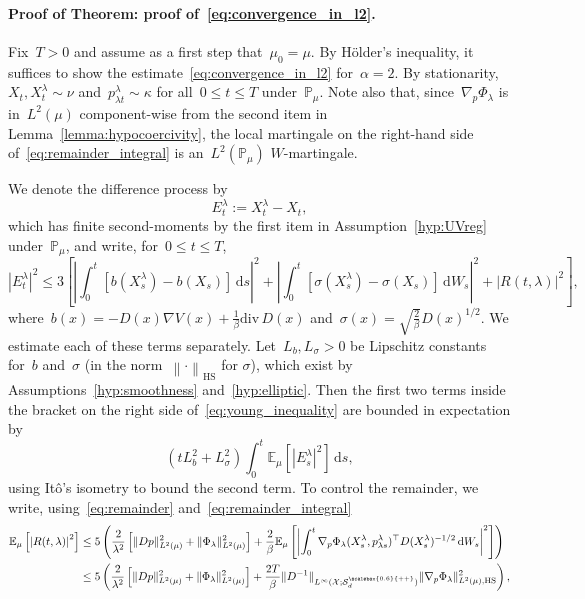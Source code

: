 \documentclass[10pt]{article}
\renewcommand{\d}{\mathrm{d}}
\newcommand{\E}{\mathbb{E}}
\renewcommand{\P}{\mathbb{P}}
\renewcommand{\div}{\mathrm{div}}
\newcommand{\cX}{\mathcal{X}}
\newcommand{\cSpd}{\mathcal{S}_d^{\scalebox{0.6}{++}}}
\newcommand{\wLmu}{L^2(\mu)}
\newcommand{\1}{\mathbbm 1}
\begin{document}
\paragraph{Proof of Theorem: proof of~\eqref{eq:convergence_in_l2}.}
Fix~$T>0$ and assume as a first step that~$\mu_0=\mu$. By H\"older's inequality, it suffices to show the estimate~\eqref{eq:convergence_in_l2} for~$\alpha=2$. By stationarity,~$X_t,X_t^\lambda\sim \nu$ and~$p_{\lambda t}^\lambda\sim\kappa$ for all~$0\leq t\leq T$ under~$\P_\mu$.
Note also that, since~$\nabla_p\Phi_\lambda$ is in~$\wLmu$ component-wise from the second item in Lemma~\ref{lemma:hypocoercivity}, the local martingale on the right-hand side of~\eqref{eq:remainder_integral} is an~$L^2(\P_\mu)$ $W$-martingale.

We denote the difference process by
\begin{equation}
    E_t^\lambda := X_t^\lambda - X_t,
\end{equation}
which has finite second-moments by the first item in Assumption~\ref{hyp:UVreg} under~$\P_\mu$, and write, for~${0\leq t \leq T}$,
\begin{equation}
    \label{eq:young_inequality}
        |E_t^\lambda|^2 \leq 3 \left[\left|\int_0^t \left[b(X_s^\lambda)-b(X_s)\right]\,\d s\right|^2+\left|\int_0^t \left[\sigma(X_s^\lambda)-\sigma(X_s)\right]\,\d W_s\right|^2 + \left|R(t,\lambda)\right|^2\right],
\end{equation}
where~$b(x) = -D(x)\nabla V(x) + \frac1\beta\div\, D(x)$ and~$\sigma(x) = \sqrt{\frac2\beta}D(x)^{1/2}$. We estimate each of these terms separately. Let~$L_b,L_\sigma>0$ be Lipschitz constants for~$b$ and~$\sigma$ (in the norm~$\left\|\cdot\right\|_{\mathrm{HS}}$ for $\sigma$), which exist by Assumptions~\ref{hyp:smoothness} and~\ref{hyp:elliptic}.
Then the first two terms inside the bracket on the right side of~\eqref{eq:young_inequality} are bounded in expectation by
\begin{equation}
    \label{eq:lipschitz_bound}
    (tL_b^2+L_\sigma^2)\int_0^t \E_\mu\left[|E_s^\lambda|^2\right]\,\d s,
\end{equation}
 using It\^o's isometry to bound the second term. To control the remainder, we write, using~\eqref{eq:remainder} and~\eqref{eq:remainder_integral}
 \begin{equation}
    \begin{aligned}
    \E_\mu\left[\left|R(t,\lambda)\right|^2\right] &\leq 5\left(\frac{2}{\lambda^2}\left[\|D p\|^2_{\wLmu}+\|\Phi_\lambda\|^2_{\wLmu}\right] + \frac{2}{\beta}\E_\mu\left[\left|\int_0^t \nabla_p \Phi_\lambda(X_s^\lambda,p_{\lambda s}^\lambda)^\top D(X_s^\lambda)^{-1/2}\,\d W_s\right|^2\right]\right)\\
    &\leq 5\left(\frac{2}{\lambda^2}\left[\|D p\|^2_{\wLmu}+\|\Phi_\lambda\|^2_{\wLmu}\right] + \frac{2T}{\beta}\|D^{-1}\|_{L^\infty(\cX;\cSpd)}\|\nabla_p\Phi_\lambda\|^2_{\wLmu,\mathrm{HS}}\right),
    \end{aligned}
 \end{equation}
\end{document}
